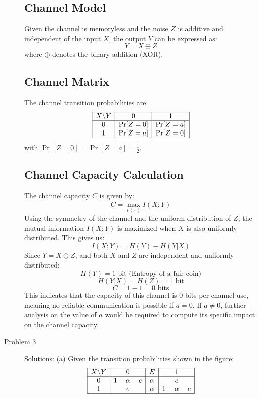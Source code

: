 \documentclass[11pt]{article}
\begin{document}
\begin{description}
    \subsection*{Channel Model}
Given the channel is memoryless and the noise \(Z\) is additive and independent of the input \(X\), the output \(Y\) can be expressed as:
\[
Y = X \oplus Z
\]
where \(\oplus\) denotes the binary addition (XOR).

\subsection*{Channel Matrix}
The channel transition probabilities are:
\[
\begin{array}{|c|c|c|}
\hline
X \backslash Y & 0 & 1 \\
\hline
0 & \Pr[Z=0] & \Pr[Z=a] \\
1 & \Pr[Z=a] & \Pr[Z=0] \\
\hline
\end{array}
\]
with \(\Pr[Z = 0] = \Pr[Z = a] = \frac{1}{2}\).

\subsection*{Channel Capacity Calculation}
The channel capacity \(C\) is given by:
\[
C = \max_{p(x)} I(X; Y)
\]
Using the symmetry of the channel and the uniform distribution of \(Z\), the mutual information \(I(X; Y)\) is maximized when \(X\) is also uniformly distributed. This gives us:
\[
I(X; Y) = H(Y) - H(Y|X)
\]
Since \(Y = X \oplus Z\), and both \(X\) and \(Z\) are independent and uniformly distributed:
\[
H(Y) = 1 \text{ bit (Entropy of a fair coin)}
\]
\[
H(Y|X) = H(Z) = 1 \text{ bit}
\]
\[
C = 1 - 1 = 0 \text{ bits}
\]
This indicates that the capacity of this channel is 0 bits per channel use, meaning no reliable communication is possible if \(a = 0\). If \(a \neq 0\), further analysis on the value of \(a\) would be required to compute its specific impact on the channel capacity.

    \item[Problem 3] Solutions:
        \subitem(a)
            Given the transition probabilities shown in the figure:
                \[
                \begin{array}{|c|c|c|c|}
                \hline
                X \backslash Y & 0 & E & 1 \\
                \hline
                0 & 1 - \alpha - e & \alpha & e \\
                1 & e & \alpha & 1 - \alpha - e \\
                \hline
                \end{array}
                \]


\end{description}
\end{document}
